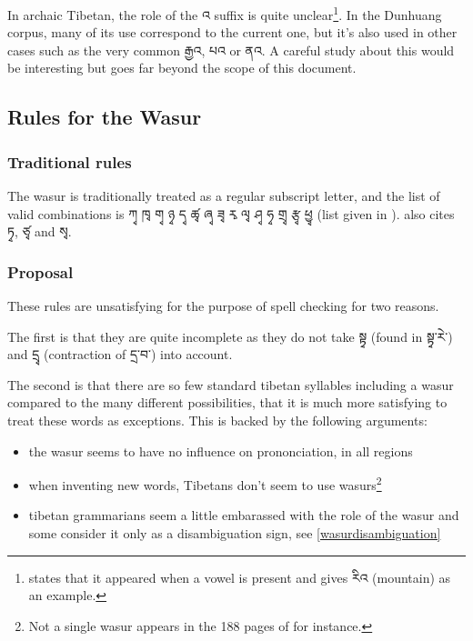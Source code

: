 \documentclass[%
a4paper,%
pagesize,%
12pt,%
parskip=off,%
bibliography=totoc,%
numbers=noenddot,%
DIV=12,%
twoside=semi,%
headings=normal%
]{scrartcl}
\begin{document}
In archaic Tibetan, the role of the འ suffix is quite unclear\footnote{\cite{TournadreMST} states that it appeared when a vowel is present and gives རིའ (mountain) as an example.}. In the Dunhuang corpus, many of its use correspond to the current one, but it's also used in other cases such as the very common རྒྱའ, པའ or ནའ. A careful study about this would be interesting but goes far beyond the scope of this document.

\subsection{Rules for the Wasur}

\subsubsection*{Traditional rules}

­The wasur is traditionally treated as a regular subscript letter, and the list of valid combinations is ཀྭ ཁྭ གྭ ཉྭ དྭ ཚྭ ཞྭ ཟྭ རྭ ལྭ ཤྭ ཧྭ གྲྭ རྩྭ ཕྱྭ (list given in \cite{TsheshabGrammarTopics}). \cite{TournadreMST} also cites ཏྭ, ཙྭ and སྭ.

\subsubsection*{Proposal}

These rules are unsatisfying for the purpose of spell checking for two reasons.

The first is that they are quite incomplete as they do not take སྟྭ (found in སྟྭ་རེ་) and དྲྭ (contraction of དྲ་བ་) into account.

The second is that there are so few standard tibetan syllables including a wasur compared to the many different possibilities, that it is much more satisfying to treat these words as exceptions. This is backed by the following arguments:

\begin{itemize}
\item the wasur seems to have no influence on prononciation, in all regions
\item when inventing new words, Tibetans don't seem to use wasurs\footnote{Not a single wasur appears in the 188 pages of \cite{TseringIT} for instance.}
\item tibetan grammarians seem a little embarassed with the role of the wasur and some consider it only as a disambiguation sign, see \ref{wasurdisambiguation}
\end{itemize}
\end{document}
